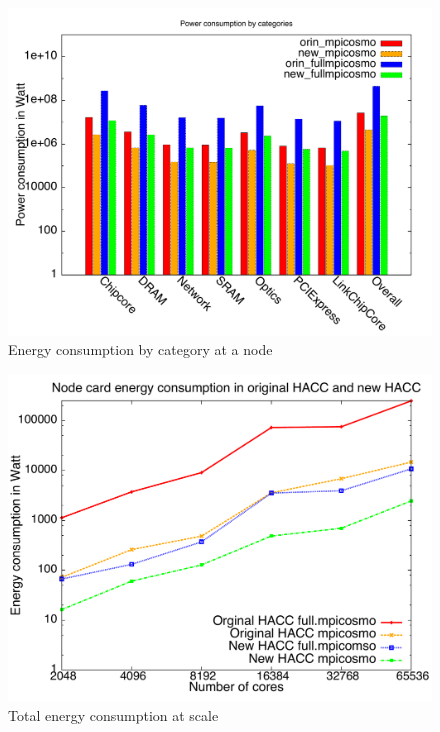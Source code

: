 \documentclass[final,5p,times]{elsarticle}
\begin{document}
\begin{figure}[!htb]
\vspace{-0.1in}
\centering
\includegraphics[scale=0.3]{figures/power_cat.pdf}
\vspace{-0.1in}
\caption{Energy consumption by category at a node}
\vspace{-0.1in}
\label{fig:hacc_agg}
\end{figure}

\begin{figure}[!htb]
\vspace{-0.1in}
\centering
\includegraphics[scale=0.3]{figures/power_ncp.pdf}
\vspace{-0.1in}
\caption{Total energy consumption at scale}
\vspace{-0.1in}
\label{fig:hacc_agg}
\end{figure}
\end{document}
